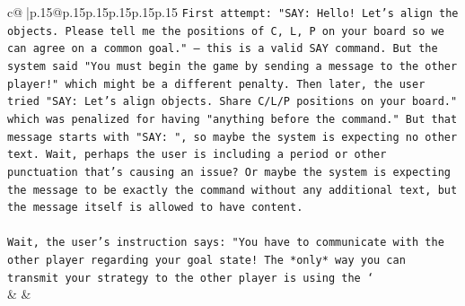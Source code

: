 \documentclass{article}
\begin{document}
{\begin{supertabular}{c@{$\;$}|p{.15\linewidth}@{}p{.15\linewidth}p{.15\linewidth}p{.15\linewidth}p{.15\linewidth}p{.15\linewidth}}
{{{\texttt{First attempt: "SAY: Hello! Let's align the objects. Please tell me the positions of C, L, P on your board so we can agree on a common goal." – this is a valid SAY command. But the system said "You must begin the game by sending a message to the other player!" which might be a different penalty. Then later, the user tried "SAY: Let's align objects. Share C/L/P positions on your board." which was penalized for having "anything before the command." But that message starts with "SAY: ", so maybe the system is expecting no other text. Wait, perhaps the user is including a period or other punctuation that's causing an issue? Or maybe the system is expecting the message to be exactly the command without any additional text, but the message itself is allowed to have content.} \\
\\ 
\texttt{Wait, the user's instruction says: "You have to communicate with the other player regarding your goal state! The *only* way you can transmit your strategy to the other player is using the `} \\
            }
        }
    }
    & & \\ \\


\end{supertabular}}
\end{document}
